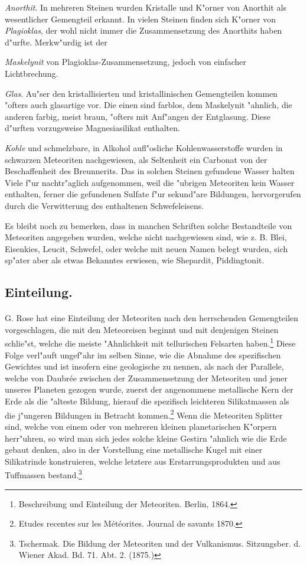 \documentclass[a4paper, 11pt, oneside, polutonikogreek, german]{article}
\begin{document}
\emph{Anorthit}. In mehreren Steinen wurden Kristalle und K"orner von Anorthit als wesentlicher Gemengteil erkannt. In vielen Steinen finden sich K"orner von \emph{Plagioklas}, der wohl nicht immer die Zusammensetzung des Anorthits haben d"urfte. Merkw"urdig ist der

\emph{Maskelynit} von Plagioklas-Zusammensetzung, jedoch von einfacher Lichtbrechung.

\emph{Glas}. Au"ser den kristallisierten und kristallinischen Gemengteilen kommen "ofters auch glasartige vor. Die einen sind farblos, dem Maskelynit "ahnlich, die anderen farbig, meist braun, "ofters mit Anf"angen der Entglasung. Diese d"urften vorzugsweise Magnesiasilikat enthalten.

\emph{Kohle} und schmelzbare, in Alkohol aufl"osliche Kohlenwasserstoffe wurden in schwarzen Meteoriten nachgewiesen, als Seltenheit ein Carbonat von der Beschaffenheit des Breunnerits. Das in solchen Steinen gefundene Wasser halten Viele f"ur nachtr"aglich aufgenommen, weil die "ubrigen Meteoriten kein Wasser enthalten, ferner die gefundenen Sulfate f"ur sekund"are Bildungen, hervorgerufen durch die Verwitterung des enthaltenen Schwefeleisens.

Es bleibt noch zu bemerken, dass in manchen Schriften solche Bestandteile von Meteoriten angegeben wurden, welche nicht nachgewiesen sind, wie z. B. Blei, Eisenkies, Leucit, Schwefel, oder welche mit neuen Namen belegt wurden, sich sp"ater aber als etwas Bekanntes erwiesen, wie Shepardit, Piddingtonit.

\subsection{Einteilung.}
\paragraph*{}
G. Rose hat eine Einteilung der Meteoriten nach den herrschenden Gemengteilen vorgeschlagen, die mit den Meteoreisen beginnt und mit denjenigen Steinen schlie"st, welche die meiste "Ahnlichkeit mit tellurischen Felsarten haben.\footnote{Beschreibung und Einteilung der Meteoriten. Berlin, 1864.} Diese Folge verl"auft ungef"ahr im selben Sinne, wie die Abnahme des spezifischen Gewichtes und ist insofern eine geologische zu nennen, als nach der Parallele, welche von Daubrée zwischen der Zusammensetzung der Meteoriten und jener unseres Planeten gezogen wurde, zuerst der angenommene metallische Kern der Erde als die "alteste Bildung, hierauf die spezifisch leichteren Silikatmassen als die j"ungeren Bildungen in Betracht kommen.\footnote{Etudes recentes sur les Météorites. Journal de savants 1870.} Wenn die Meteoriten Splitter sind, welche von einem oder von mehreren kleinen planetarischen K"orpern herr"uhren, so wird man sich jedes solche kleine Gestirn "ahnlich wie die Erde gebaut denken, also in der Vorstellung eine metallische Kugel mit einer Silikatrinde konstruieren, welche letztere aus Erstarrungsprodukten und aus Tuffmassen bestand.\footnote{Tschermak. Die Bildung der Meteoriten und der Vulkanismus. Sitzungsber. d. Wiener Akad. Bd. 71. Abt. 2. (1875.)}
\end{document}
